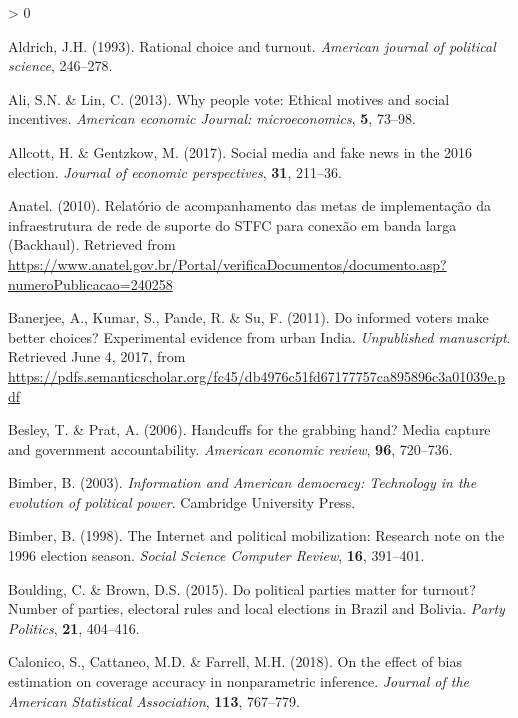 \documentclass[
  12pt,
]{article}
\newlength{\cslhangindent}
\newenvironment{CSLReferences}[2] %
 {%
  \setlength{\parindent}{0pt}
  \ifodd #1 \everypar{\setlength{\hangindent}{\cslhangindent}}\ignorespaces\fi
  \ifnum #2 > 0
  \setlength{\parskip}{#2\baselineskip}
  \fi
 }%
 {}
\begin{document}
\hypertarget{refs}{}
\begin{CSLReferences}{1}{0}
\leavevmode\hypertarget{ref-aldrich_rational_1993}{}%
Aldrich, J.H. (1993). Rational choice and turnout. \emph{American
journal of political science}, 246--278.

\leavevmode\hypertarget{ref-ali_why_2013}{}%
Ali, S.N. \& Lin, C. (2013). Why people vote: {Ethical} motives and
social incentives. \emph{American economic Journal: microeconomics},
\textbf{5}, 73--98.

\leavevmode\hypertarget{ref-allcott_social_2017}{}%
Allcott, H. \& Gentzkow, M. (2017). Social media and fake news in the
2016 election. \emph{Journal of economic perspectives}, \textbf{31},
211--36.

\leavevmode\hypertarget{ref-anatel_relatorio_2010}{}%
Anatel. (2010). Relatório de acompanhamento das metas de implementação
da infraestrutura de rede de suporte do {STFC} para conexão em banda
larga ({Backhaul}). Retrieved from
\url{https://www.anatel.gov.br/Portal/verificaDocumentos/documento.asp?numeroPublicacao=240258}

\leavevmode\hypertarget{ref-banerjee_informed_2011}{}%
Banerjee, A., Kumar, S., Pande, R. \& Su, F. (2011). Do informed voters
make better choices? {Experimental} evidence from urban {India}.
\emph{Unpublished manuscript}. Retrieved June 4, 2017, from
\url{https://pdfs.semanticscholar.org/fc45/db4976c51fd67177757ca895896c3a01039e.pdf}

\leavevmode\hypertarget{ref-besley_handcuffs_2006}{}%
Besley, T. \& Prat, A. (2006). Handcuffs for the grabbing hand? {Media}
capture and government accountability. \emph{American economic review},
\textbf{96}, 720--736.

\leavevmode\hypertarget{ref-bimber_information_2003}{}%
Bimber, B. (2003). \emph{Information and {American} democracy:
{Technology} in the evolution of political power}. Cambridge University
Press.

\leavevmode\hypertarget{ref-bimber_internet_1998}{}%
Bimber, B. (1998). The {Internet} and political mobilization: {Research}
note on the 1996 election season. \emph{Social Science Computer Review},
\textbf{16}, 391--401.

\leavevmode\hypertarget{ref-boulding_political_2015}{}%
Boulding, C. \& Brown, D.S. (2015). Do political parties matter for
turnout? {Number} of parties, electoral rules and local elections in
{Brazil} and {Bolivia}. \emph{Party Politics}, \textbf{21}, 404--416.

\leavevmode\hypertarget{ref-calonico_effect_2018}{}%
Calonico, S., Cattaneo, M.D. \& Farrell, M.H. (2018). On the effect of
bias estimation on coverage accuracy in nonparametric inference.
\emph{Journal of the American Statistical Association}, \textbf{113},
767--779.


\end{CSLReferences}
\end{document}
